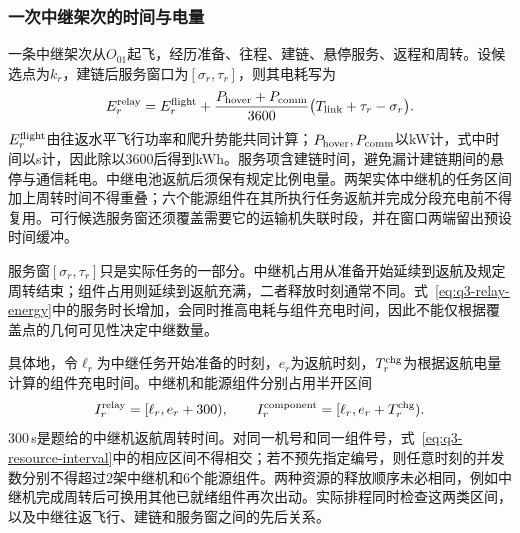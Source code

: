 \documentclass[bwprint,fontset=fandol]{gmcmthesis}
\begin{document}
\subsubsection{一次中继架次的时间与电量}
一条中继架次从$O_{01}$起飞，经历准备、往程、建链、悬停服务、返程和周转。设候选点为$k_r$，建链后服务窗口为$[\sigma_r,\tau_r]$，则其电耗写为
\begin{equation}
E_r^{\rm relay}=E_r^{\rm flight}
+\frac{P_{\rm hover}+P_{\rm comm}}{3600}
\bigl(T_{\rm link}+\tau_r-\sigma_r\bigr).
\label{eq:q3-relay-energy}
\end{equation}
$E_r^{\rm flight}$由往返水平飞行功率和爬升势能共同计算；$P_{\rm hover},P_{\rm comm}$以kW计，式中时间以s计，因此除以3600后得到kWh。服务项含建链时间，避免漏计建链期间的悬停与通信耗电。中继电池返航后须保有规定比例电量。两架实体中继机的任务区间加上周转时间不得重叠；六个能源组件在其所执行任务返航并完成分段充电前不得复用。可行候选服务窗还须覆盖需要它的运输机失联时段，并在窗口两端留出预设时间缓冲。

服务窗$[\sigma_r,\tau_r]$只是实际任务的一部分。中继机占用从准备开始延续到返航及规定周转结束；组件占用则延续到返航充满，二者释放时刻通常不同。式~\eqref{eq:q3-relay-energy}中的服务时长增加，会同时推高电耗与组件充电时间，因此不能仅根据覆盖点的几何可见性决定中继数量。

具体地，令$\ell_r$为中继任务开始准备的时刻，$e_r$为返航时刻，$T^{\rm chg}_r$为根据返航电量计算的组件充电时间。中继机和能源组件分别占用半开区间
\begin{equation}
I_r^{\rm relay}=[\ell_r,e_r+300),\qquad
I_r^{\rm component}=[\ell_r,e_r+T^{\rm chg}_r).
\label{eq:q3-resource-interval}
\end{equation}
300\,s是题给的中继机返航周转时间。对同一机号和同一组件号，式~\eqref{eq:q3-resource-interval}中的相应区间不得相交；若不预先指定编号，则任意时刻的并发数分别不得超过2架中继机和6个能源组件。两种资源的释放顺序未必相同，例如中继机完成周转后可换用其他已就绪组件再次出动。实际排程同时检查这两类区间，以及中继往返飞行、建链和服务窗之间的先后关系。
\end{document}
